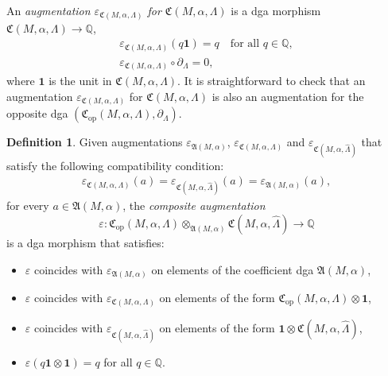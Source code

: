 \documentclass[10pt]{amsart}
\let\epsilon\varepsilon
\newcommand{\opp}{\mathrm{op}}
\theoremstyle{plain}
\theoremstyle{definition}
\newtheorem{defn}[thm]{Definition}
\numberwithin{equation}{subsection}
\begin{document}
An {\em augmentation $\epsilon_{\mathfrak{C}(M,\alpha,\Lambda)}$ for $\mathfrak{C}(M,\alpha,\Lambda)$} is a dga morphism $\mathfrak{C}(M,\alpha,\Lambda)\to\mathbb{Q}$, \ie
\begin{gather}
\epsilon_{\mathfrak{C}(M,\alpha,\Lambda)} (q \mathbf{1}) = q \quad\mbox{for all } q \in \mathbb{Q},\\
\epsilon_{\mathfrak{C}(M,\alpha,\Lambda)} \circ \partial_{\Lambda} =0,
\end{gather}
where $\mathbf{1}$ is the unit in $\mathfrak{C}(M,\alpha,\Lambda)$. It is straightforward to check that an augmentation $\epsilon_{\mathfrak{C}(M,\alpha,\Lambda)}$ for $\mathfrak{C}(M,\alpha,\Lambda)$ is also an augmentation for the opposite dga $(\mathfrak{C}_{\opp}(M,\alpha,\Lambda),\partial_\Lambda)$.

\begin{defn}
Given augmentations $\epsilon_{\mathfrak{A}(M,\alpha)}$, $\epsilon_{\mathfrak{C}(M,\alpha,\Lambda)}$ and $\epsilon_{\mathfrak{C}(M,\alpha,\widehat{\Lambda})}$ that satisfy the following compatibility condition:
\begin{gather}
\epsilon_{\mathfrak{C}(M,\alpha,\Lambda)}(a) = \epsilon_{\mathfrak{C}(M,\alpha,\widehat{\Lambda})} (a) = \epsilon_{\mathfrak{A}(M,\alpha)}(a),
\end{gather}
for every $a \in \mathfrak{A}(M,\alpha)$, the {\em composite augmentation}
\begin{equation}%
\epsilon:\mathfrak{C}_{\opp}(M,\alpha,\Lambda) \otimes_{\mathfrak{A}(M,\alpha)} \mathfrak{C}(M,\alpha,\widehat{\Lambda})\to\mathbb{Q}
\end{equation}
is a dga morphism that satisfies:
\begin{itemize}
\item $\epsilon$ coincides with $\epsilon_{\mathfrak{A}(M,\alpha)}$ on elements of the coefficient dga $\mathfrak{A}(M,\alpha)$,
\item $\epsilon$ coincides with $\epsilon_{\mathfrak{C}(M,\alpha,\Lambda)}$ on elements of the form $\mathfrak{C}_{\opp}(M,\alpha,\Lambda) \otimes \mathbf{1}$,
\item $\epsilon$ coincides with $\epsilon_{\mathfrak{C}(M,\alpha,\widehat{\Lambda})}$ on elements of the form $\mathbf{1} \otimes \mathfrak{C}(M,\alpha,\widehat{\Lambda})$,
\item $\epsilon(q\mathbf{1} \otimes \mathbf{1}) = q$ for all $q\in \mathbb{Q}$.
\end{itemize}
\end{defn}
\end{document}

